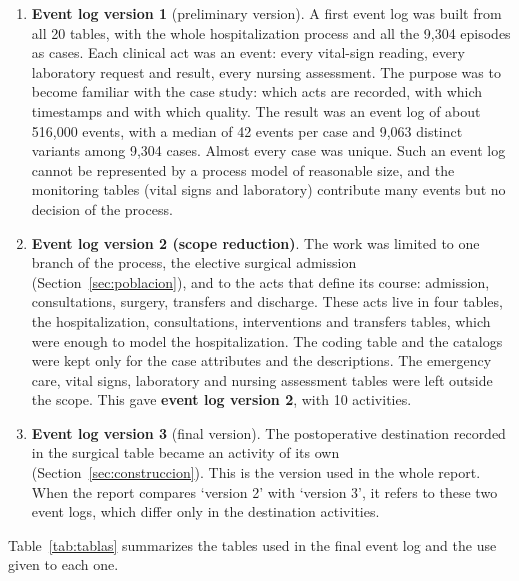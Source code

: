\begin{enumerate}[leftmargin=*]
  \item \textbf{Event log version 1} (preliminary version). A first event log was built from all 20 tables, with the whole hospitalization process and all the 9,304 episodes as cases. Each clinical act was an event: every vital-sign reading, every laboratory request and result, every nursing assessment. The purpose was to become familiar with the case study: which acts are recorded, with which timestamps and with which quality. The result was an event log of about 516,000 events, with a median of 42 events per case and 9,063 distinct variants among 9,304 cases. Almost every case was unique. Such an event log cannot be represented by a process model of reasonable size, and the monitoring tables (vital signs and laboratory) contribute many events but no decision of the process.
  \item \textbf{Event log version 2 (scope reduction)}. The work was limited to one branch of the process, the elective surgical admission (Section~\ref{sec:poblacion}), and to the acts that define its course: admission, consultations, surgery, transfers and discharge. These acts live in four tables, the hospitalization, consultations, interventions and transfers tables, which were enough to model the hospitalization. The coding table and the catalogs were kept only for the case attributes and the descriptions. The emergency care, vital signs, laboratory and nursing assessment tables were left outside the scope. This gave \textbf{event log version 2}, with 10 activities.
  \item \textbf{Event log version 3} (final version). The postoperative destination recorded in the surgical table became an activity of its own (Section~\ref{sec:construccion}). This is the version used in the whole report. When the report compares `version 2' with `version 3', it refers to these two event logs, which differ only in the destination activities.
\end{enumerate}

Table~\ref{tab:tablas} summarizes the tables used in the final event log and the use given to each one.

